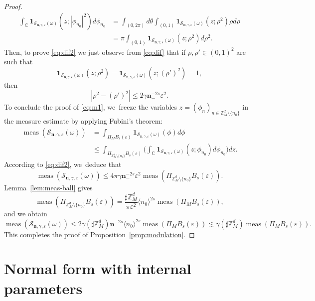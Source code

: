 \documentclass[10pt,a4paper]{amsart}
\theoremstyle{plain}
\theoremstyle{definition}
\DeclareMathOperator{\meas}{meas}
\newcommand{\nb}{{\boldsymbol n}}
\newcommand{\Z}{\mathbb{Z}}
\newcommand{\C}{\mathbb{C}}
\newcommand{\1}{\mathbf{1}}
\let\epsilon\varepsilon
\begin{document}
\begin{proof}
\begin{equation*}
\begin{split}
\int_{\C}\mathbf{1}_{\mathcal{S}_{\nb,\gamma,\epsilon}(\omega)}(z; |\phi_{n_{0}}|^{2})d\phi_{n_0}
&= \int_{(0,2\pi)}d\theta\int_{(0,1)}\mathbf{1}_{\mathcal{S}_{\nb,\gamma,\epsilon}(\omega)}(z ; \rho^{2})\rho d\rho \\
&= \pi\int_{(0,1)}\mathbf{1}_{\mathcal{S}_{\nb,\gamma,\epsilon}(\omega)}(z ; \rho^{2})d\rho^{2}.
\end{split}
\end{equation*}
Then, to prove \eqref{eq:dif2} we just observe from \eqref{eq:dif} that if $\rho,\rho'\in(0,1)^2$ are such that
\[
\mathbf{1}_{\mathcal{S}_{\nb,\gamma,\epsilon}(\omega)}(z;\rho^2) =\mathbf{1}_{\mathcal{S}_{\nb,\gamma,\epsilon}(\omega)}(z ;(\rho')^{2})=1,
\]
then
\[
|\rho^{2} -(\rho')^{2}| \leq 2\gamma\nb_-^{-2s}\epsilon^2.
\]
To conclude the proof of \eqref{eq:m1}, we~freeze the variables $z=(\phi_{n})_{n\in\Z_{M}^{d}\setminus\{n_{0}\}}$ in the measure estimate by applying Fubini's theorem:
\begin{equation*}
\begin{split}
\meas(\mathcal{S}_{\nb,\gamma,\epsilon}(\omega))
&= \int_{\Pi_{M}B_{s}(\epsilon)}
\mathbf{1}_{\mathcal{S}_{\nb,\gamma,\epsilon}(\omega)}(\phi)d\phi \\
&\leq \int_{\Pi_{\Z_{M}^{d}\setminus\{n_{0}\}}B_{s}(\epsilon)}
\Big(\int_{\C}
\mathbf{1}_{\mathcal{S}_{\nb,\gamma,\epsilon}(\omega)}(z;\phi_{n_{0}})d\phi_{n_{0}}\Big)dz.
\end{split}
\end{equation*}
According to \eqref{eq:dif2}, we~deduce that
\[
\meas(\mathcal{S}_{\nb,\gamma,\epsilon}(\omega)) \leq 4\pi\gamma\nb_{-}^{-2s}\epsilon^{2}\meas(\Pi_{\Z_{M}^{d}\setminus\{n_{0}\}}B_{s}(\epsilon)).
\]
Lemma~\ref{lem:meas-ball} gives
\[
\meas(\Pi_{\Z_{M}^{d}\setminus\{n_{0}\}}B_{s}(\epsilon))
=\frac{\sharp\Z_{M}^{d}}{\pi \epsilon^{2}}\langle n_{0}\rangle^{2s}
\meas(\Pi_{M}B_{s}(\epsilon)),
\]
and we obtain
\[
\meas(\mathcal{S}_{\nb,\gamma,\epsilon}(\omega)) \leq 2\gamma (\sharp\Z_{M}^{d})\nb^{-2s}\langle n_{0}\rangle^{2s} \meas(\Pi_{M}B_{s}(\epsilon)) \lesssim\gamma(\sharp\Z_{M}^{d})\meas(\Pi_{M}B_{s}(\epsilon)).
\]
This completes the proof of Proposition~\ref{prop:modulation}.
\end{proof}

\section{Normal form with internal parameters}
\label{sec:main-nf}
\end{document}
